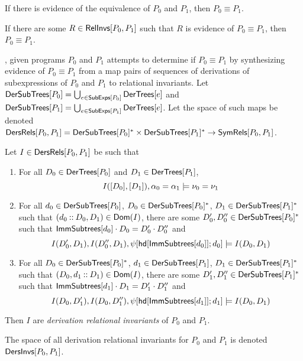 \begin{ex}
  \label{ex:rel-invs}
\end{ex}

If there is evidence of the equivalence of $P_0$ and $P_1$, then $P_0
\equiv P_1$.
%
\begin{lemma}
  \label{lemma:equiv-evidence}
  If there are some $R \in \mathsf{RelInvs}[ P_0, P_1 ]$ such that $R$ is
  evidence of $P_0 \equiv P_1$, then $P_0 \equiv P_1$.
\end{lemma}

\sys, given programs $P_0$ and $P_1$ attempts to determine if $P_0
\equiv P_1$ by synthesizing evidence of $P_0 \equiv P_1$ from a map
pairs of sequences of derivations of subexpressions of $P_0$ and $P_1$
to relational invariants.
%
%
Let $\mathsf{DerSubTrees}[ P_0 ] = \bigcup_{e \in \mathsf{SubExps}[ P_0 ]} \mathsf{DerTrees}[  e
 ]$ and $\mathsf{DerSubTrees}[ P_1 ] = \bigcup_{e \in \mathsf{SubExps}[ P_1 ]} \mathsf{DerTrees}[ 
  e  ]$.
%
Let the space of such maps be denoted $\mathsf{DersRels}[ P_0, P_1 ] =
\mathsf{DerSubTrees}[ P_0 ]^{*} \times \mathsf{DerSubTrees}[ P_1 ]^{*} \to
\mathsf{SymRels}[ P_0, P_1 ]$.
%
\begin{defn}
  \label{defn:der-rel-invs}
  Let $I \in \mathsf{DersRels}[ P_0, P_1 ]$ be such that %
  \begin{enumerate}
  \item 
    For all $D_0 \in \mathsf{DerTrees}[ P_0 ]$ and $D_1 \in \mathsf{DerTrees}[ P_1 ]$,
    \[ I([ D_0 ], [ D_1 ]), \alpha_0 = \alpha_1 \entails %
    \nu_0 = \nu_1 \]
  \item 
    For all $d_0 \in \mathsf{DerSubTrees}[ P_0 ]$, %
    $D_0 \in \mathsf{DerSubTrees}[ P_0 ]^{*}$, %
    $D_1 \in \mathsf{DerSubTrees}[ P_1 ]^{*}$ such that $(d_0 \mathbin{::} D_0, D_1)
    \in \mathsf{Dom}(I)$, %
    there are some $D_0', D_0'' \in \mathsf{DerSubTrees}[ P_0 ]^{*}$ such that
    $\mathsf{ImmSubtrees}[ d_0 ] \cdot D_0 = D_0' \cdot D_0''$ and %
    \[ I(D_0', D_1), I(D_0'', D_1), %
    \symstep{ \head{ \immsubtrees{ d_0 } } }{ d_0 } \entails %
    I(D_0, D_1) \]
  \item 
    For all $D_0 \in \mathsf{DerSubTrees}[ P_0 ]^{*}$, %
    $d_1 \in \mathsf{DerSubTrees}[ P_1 ]$, %
    $D_1 \in \mathsf{DerSubTrees}[ P_1 ]^{*}$ such that $(D_0, d_1 \mathbin{::} D_1)
    \in \mathsf{Dom}(I)$, %
    there are some $D_1', D_1'' \in \mathsf{DerSubTrees}[ P_1 ]^{*}$ such that
    $\mathsf{ImmSubtrees}[ d_1 ] \cdot D_1 = D_1' \cdot D_1''$ and %
    \[ I(D_0, D_1'), I(D_0, D_1''), %
    \symstep{ \head { \immsubtrees{ d_1 } } }{ d_1 } \entails %
    I(D_0, D_1) \]
  \end{enumerate}
  Then $I$ are \emph{derivation relational invariants} of $P_0$ and
  $P_1$.
\end{defn}
%
The space of all derivation relational invariants for $P_0$ and $P_1$
is denoted $\mathsf{DersInvs}[ P_0, P_1 ]$.
%

